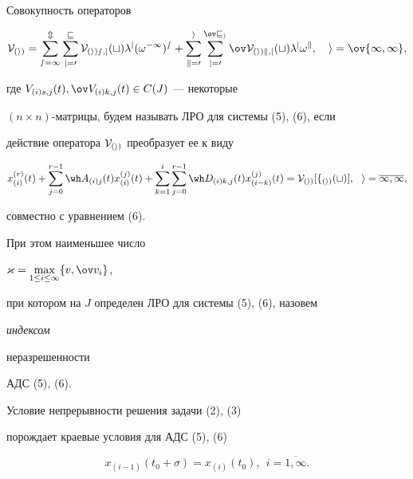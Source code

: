 \begin{defn}


Совокупность операторов


\begin{equation}


\cal V_{(i)}= \sum_{s=1}^{m}{\sum_{j=0}^{v}{V_{(i)s,j}(t)


\lambda^j (\omega^{-1})^s}} +


\sum_{k=0}^{i}{\sum_{j=0}^{\ov v_i}{\ov V_{(i)k,j}(t) \lambda^j \omega^k}},


\quad i=\ov{1,\infty},


\end{equation}


где $V_{(i)s,j}(t), \ov V_{(i)k,j}(t) \in C(J)$ --- некоторые 


$(n \times n)$-матрицы, будем называть ЛРО для системы (5), (6), если


действие оператора $\cal V_{(i)}$ преобразует ее к виду


\begin{equation}


x_{(i)}^{(r)}(t)+


\sum_{j=0}^{r-1}{\wh A_{(i)j}(t)x_{(i)}^{(j)}(t)} +\sum_{k=1}^{i}


{\sum_{j=0}^{r-1}{\wh D_{(i)k,j}(t)x_{(i-k)}^{(j)}(t)}}=


\cal V_{(i)}[f_{(i)}(t)], \ \ i=\overline{1,\infty}, 


\end{equation}


совместно с уравнением (6).


\end{defn}





При этом наименьшее число


$\varkappa=\max\limits_{1 \le i \le \infty} \lbrace v,\ov v_i \rbrace$,


при котором на $J$ определен ЛРО для системы (5), (6), назовем {\it индексом


неразрешенности} АДС (5), (6).





Условие непрерывности решения задачи (2), (3) 


порождает краевые условия для АДС (5), (6)


\begin{equation}


x_{(i-1)}(t_0+\sigma)=x_{(i)}(t_0), \ \  i=\overline{1, \infty}.


\end{equation}


